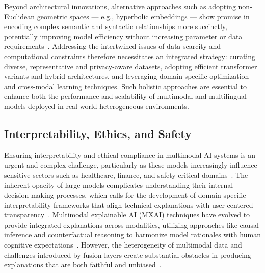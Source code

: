 \documentclass[sigconf]{acmart}
\begin{document}
Beyond architectural innovations, alternative approaches such as adopting non-Euclidean geometric spaces — e.g., hyperbolic embeddings — show promise in encoding complex semantic and syntactic relationships more succinctly, potentially improving model efficiency without increasing parameter or data requirements~\cite{ref33}. Addressing the intertwined issues of data scarcity and computational constraints therefore necessitates an integrated strategy: curating diverse, representative and privacy-aware datasets, adopting efficient transformer variants and hybrid architectures, and leveraging domain-specific optimization and cross-modal learning techniques. Such holistic approaches are essential to enhance both the performance and scalability of multimodal and multilingual models deployed in real-world heterogeneous environments.

\subsection{Interpretability, Ethics, and Safety}

Ensuring interpretability and ethical compliance in multimodal AI systems is an urgent and complex challenge, particularly as these models increasingly influence sensitive sectors such as healthcare, finance, and safety-critical domains~\cite{ref11,ref12,ref13}. The inherent opacity of large models complicates understanding their internal decision-making processes, which calls for the development of domain-specific interpretability frameworks that align technical explanations with user-centered transparency~\cite{ref28,ref34}. Multimodal explainable AI (MXAI) techniques have evolved to provide integrated explanations across modalities, utilizing approaches like causal inference and counterfactual reasoning to harmonize model rationales with human cognitive expectations~\cite{ref11,ref13}. However, the heterogeneity of multimodal data and challenges introduced by fusion layers create substantial obstacles in producing explanations that are both faithful and unbiased~\cite{ref28}.
\end{document}
